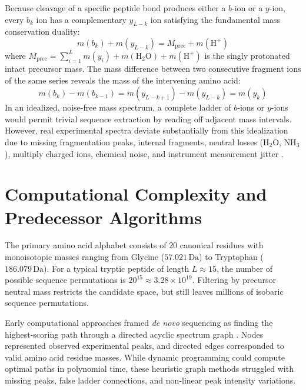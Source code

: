 Because cleavage of a specific peptide bond produces either a $b$-ion or a $y$-ion, every $b_k$ ion has a complementary $y_{L-k}$ ion satisfying the fundamental mass conservation duality:
\begin{equation}
m(b_k) + m(y_{L-k}) = M_{\text{prec}} + m(\text{H}^+)
\label{eq:complementary_ion_duality}
\end{equation}
where $M_{\text{prec}} = \sum_{i=1}^L m(y_i) + m(\text{H}_2\text{O}) + m(\text{H}^+)$ is the singly protonated intact precursor mass. The mass difference between two consecutive fragment ions of the same series reveals the mass of the intervening amino acid:
\begin{equation}
m(b_{k}) - m(b_{k-1}) = m(y_{L-k+1}) - m(y_{L-k}) = m(y_k)
\label{eq:mass_ladder}
\end{equation}
In an idealized, noise-free mass spectrum, a complete ladder of $b$-ions or $y$-ions would permit trivial sequence extraction by reading off adjacent mass intervals. However, real experimental spectra deviate substantially from this idealization due to missing fragmentation peaks, internal fragments, neutral losses ($\text{H}_2\text{O}$, $\text{NH}_3$), multiply charged ions, chemical noise, and instrument measurement jitter \citep{Paizs2005}.

\section{Computational Complexity and Predecessor Algorithms}

The primary amino acid alphabet consists of 20 canonical residues with monoisotopic masses ranging from Glycine ($57.021\,\text{Da}$) to Tryptophan ($186.079\,\text{Da}$). For a typical tryptic peptide of length $L \approx 15$, the number of possible sequence permutations is $20^{15} \approx 3.28 \times 10^{19}$. Filtering by precursor neutral mass restricts the candidate space, but still leaves millions of isobaric sequence permutations.

Early computational approaches framed \emph{de novo} sequencing as finding the highest-scoring path through a directed acyclic spectrum graph \citep{Dancik1999, Chen2001, Frank2005}. Nodes represented observed experimental peaks, and directed edges corresponded to valid amino acid residue masses. While dynamic programming could compute optimal paths in polynomial time, these heuristic graph methods struggled with missing peaks, false ladder connections, and non-linear peak intensity variations.

